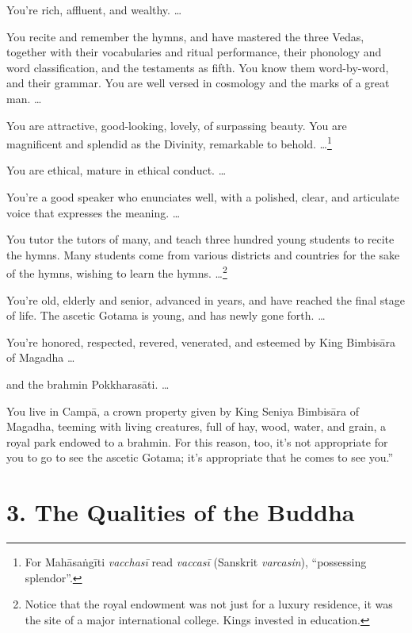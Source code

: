 \documentclass[12pt,openany]{book}%
\begin{document}
You’re rich, affluent, and wealthy. … 

You recite and remember the hymns, and have mastered the three Vedas, together with their vocabularies and ritual performance, their phonology and word classification, and the testaments as fifth. You know them word-by-word, and their grammar. You are well versed in cosmology and the marks of a great man. … 

You are attractive, good-looking, lovely, of surpassing beauty. You are magnificent and splendid as the Divinity, remarkable to behold. …\footnote{For \textsanskrit{Mahāsaṅgīti} \textit{\textsanskrit{vacchasī}} read \textit{\textsanskrit{vaccasī}} (Sanskrit \textit{varcasin}), “possessing splendor”. } 

You are ethical, mature in ethical conduct. … 

You’re a good speaker who enunciates well, with a polished, clear, and articulate voice that expresses the meaning. … 

You tutor the tutors of many, and teach three hundred young students to recite the hymns. Many students come from various districts and countries for the sake of the hymns, wishing to learn the hymns. …\footnote{Notice that the royal endowment was not just for a luxury residence, it was the site of a major international college. Kings invested in education. } 

You’re old, elderly and senior, advanced in years, and have reached the final stage of life. The ascetic Gotama is young, and has newly gone forth. … 

You’re honored, respected, revered, venerated, and esteemed by King \textsanskrit{Bimbisāra} of Magadha … 

and the brahmin \textsanskrit{Pokkharasāti}. … 

You live in \textsanskrit{Campā}, a crown property given by King Seniya \textsanskrit{Bimbisāra} of Magadha, teeming with living creatures, full of hay, wood, water, and grain, a royal park endowed to a brahmin. For this reason, too, it’s not appropriate for you to go to see the ascetic Gotama; it’s appropriate that he comes to see you.” 

\section*{3. The Qualities of the Buddha }
\end{document}
